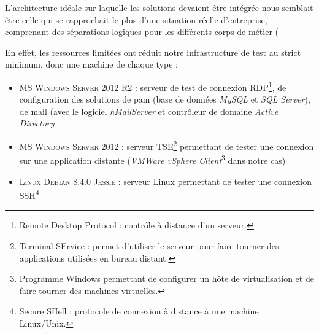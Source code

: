 L'architecture idéale sur laquelle les solutions devaient être intégrée nous semblait être celle qui se rapprochait le plus d'une situation réelle d'entreprise, comprenant des séparations logiques pour les différents corps de métier (

En effet, les ressources limitées ont réduit notre infrastructure de test au strict minimum, donc une machine de chaque type :
\begin{itemize}
	\item \textsc{MS Windows Server 2012 R2} : serveur de test de connexion RDP\footnote{Remote Desktop Protocol : contrôle à distance d'un serveur.}, de configuration des solutions de \gls{pam} (base de données \emph{MySQL} et \emph{SQL Server}), de mail (avec le logiciel \emph{hMailServer} \cite{hma} et contrôleur de domaine \emph{Active Directory}
	\item \textsc{MS Windows Server 2012} : serveur TSE\footnote{Terminal SErvice : permet d'utiliser le serveur pour faire tourner des applications utilisées en bureau distant.} permettant de tester une connexion sur une application distante (\emph{VMWare vSphere Client}\footnote{Programme Windows permettant de configurer un hôte de virtualisation et de faire tourner des machines virtuelles.} dans notre cas)
	\item \textsc{Linux Debian 8.4.0 Jessie} : serveur Linux permettant de tester une connexion SSH\footnote{Secure SHell : protocole de connexion à distance à une machine Linux/Unix.}
\end{itemize}

